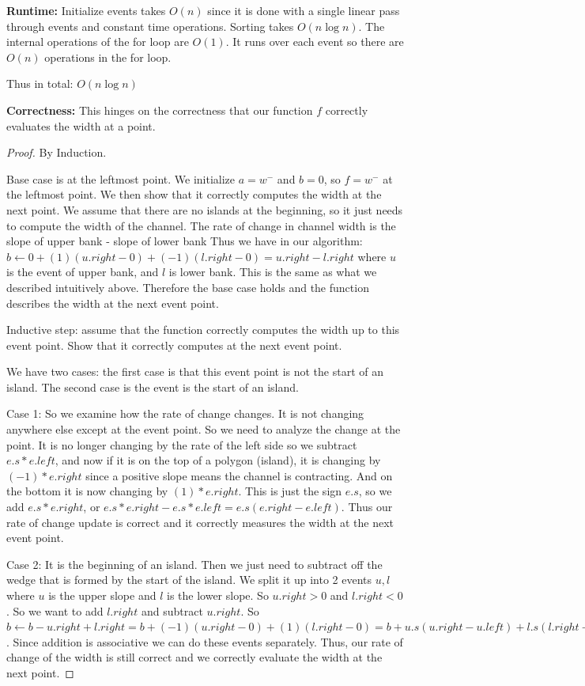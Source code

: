 \documentclass[11pt]{article}
\begin{document}
\textbf{Runtime:} Initialize events takes $O(n)$ since it is done with a single linear pass through events and constant time operations.
Sorting takes $O(n \log n)$. The internal operations of the for loop are $O(1)$. 
It runs over each event so there are $O(n)$ operations in the for loop.

Thus in total: $O(n \log n)$


\textbf{Correctness:} 
This hinges on the correctness that our function $f$ correctly evaluates the width at a point.
\newpage
\begin{proof}
    By Induction.

    Base case is at the leftmost point. We initialize $a = w^-$ and $b = 0$, so $f = w^-$
    at the leftmost point. We then show that it correctly computes the width at the next point.
    We assume that there are no islands at the beginning, so it just needs to compute the width
    of the channel. The rate of change in channel width is the slope of upper bank - slope of lower bank
    Thus we have in our algorithm: $b \gets 0 + (1) (u.right - 0) + (-1)(l.right - 0) = u.right - l.right$
    where $u$ is the event of upper bank, and $l$ is lower bank. This is the same as what we described
    intuitively above. Therefore the base case holds and the function describes the width at the next event point.

    Inductive step: assume that the function correctly computes the width up to this event point.
    Show that it correctly computes at the next event point.

    We have two cases: the first case is that this event point is not the start of an island. The second case is the event is the start of an island.
    
    Case 1: So we examine how the rate of change changes. It is not changing anywhere else except at the event point.
    So we need to analyze the change at the point.
    It is no longer changing by the rate of the left side so
    we subtract $e.s * e.left$, and now if it is on the top of a polygon (island), it is changing by $(-1) * e.right$
    since a positive slope means the channel is contracting. And on the bottom it is now changing by $(1) * e.right$.
    This is just the sign $e.s$, so we add $e.s * e.right$, or $e.s * e.right - e.s *e.left = e.s(e.right - e.left)$.
    Thus our rate of change update is correct and it correctly measures the width at the next event point.

    Case 2: It is the beginning of an island. Then we just need to subtract off the wedge that is formed by the start of the island.
    We split it up into 2 events $u, l$ where $u$ is the upper slope and $l$ is the lower slope. 
    So $u.right > 0$ and $l.right < 0$. So we want to add $l.right$ and subtract $u.right$. So 
    $b \gets b - u.right + l.right = b + (-1) (u.right - 0) + (1) (l.right - 0) = b + u.s (u.right - u.left) + l.s (l.right - l.left)$.
    Since addition is associative we can do these events separately.
    Thus, our rate of change of the width is still correct and we correctly evaluate the width at the next point.


\end{proof}
\end{document}
